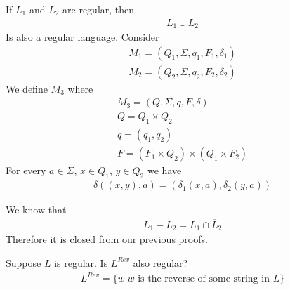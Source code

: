 \documentclass[a4paper]{article}
\theoremstyle{plain}
\theoremstyle{definition}
\newtheorem{defn}{Definition}[section]
\theoremstyle{remark}
\begin{document}
\begin{tcolorbox}[colback=black!3!white,colframe=black!60!white,title=\begin{defn}Union \label{Union}\end{defn}]
If $L_1$ and $L_2$ are regular, then
\begin{align}
L_1 \cup  L_2
\end{align}
Is also a regular language. Consider
\begin{align}
	M_1 = (Q_1,\Sigma,q_1,F_1,\delta_1) \\
	M_2=(Q_2,\Sigma,q_2,F_2,\delta_2)
\end{align}
We define $M_3$ where
\begin{align}
	M_3 = (Q,\Sigma, q, F, \delta) \\
	Q = Q_1 \times Q_2 \\
	q = (q_1,q_2) \\
	F = (F_1 \times  Q_2) \times (Q_1 \times F_2)
\end{align}
For every $a \in \Sigma$, $x \in Q_1$, $y\in Q_2$ we have
\begin{align}
	\delta((x,y),a) = (\delta_1(x,a),\delta_2(y,a))
\end{align}
\end{tcolorbox}
\begin{tcolorbox}[colback=black!3!white,colframe=black!60!white,title=\begin{defn}Subtraction \label{Subtraction}\end{defn}]
We know that
\begin{align}
L_1 - L_2 = L_1 \cap \overline{L}_2
\end{align}
Therefore it is closed from our previous proofs.
\end{tcolorbox}
\begin{tcolorbox}[colback=black!3!white,colframe=black!60!white,title=\begin{defn}Reverse \label{Reverse}\end{defn}]
Suppose $L$ is regular. Is $L^{Rev}$ also regular?
\begin{align}
L^{Rev} = \{ w | w \text{ is the reverse of some string in }L \}
\end{align}
\end{tcolorbox}
\end{document}
